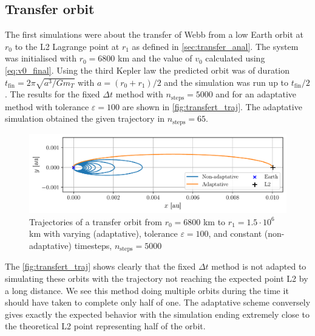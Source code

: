 \subsection{Transfer orbit}
The first simulations were about the transfer of Webb from a low Earth orbit at $r_0$ to the L2 Lagrange point at $r_1$ as defined in \autoref{sec:transfer_anal}. The system was initialised with \(r_0 = 6800\) km and the value of $v_0$ calculated using \autoref{eq:v0_final}. Using the third Kepler law the predicted orbit was of duration $t_\mathrm{fin} = 2\pi\sqrt{a^3/Gm_T}$ with $a = (r_0 + r_1)/2$ and the simulation was run up to $t_\mathrm{fin}/2$. The results for the fixed $\Delta t$ method with $n_\mathrm{steps} = 5000$ and for an adaptative method with tolerance $\varepsilon = 100$ are shown in \autoref{fig:transfert_traj}. The adaptative simulation obtained the given trajectory in $n_\mathrm{steps} = 65$.
\begin{figure}[H]
    \centering
    \includegraphics[width=\linewidth]{figures/transfert_comparaison.pdf}
    \caption{Trajectories of a transfer orbit from $r_0 = 6800$ \si{\kilo\meter} to $r_1 = 1.5 \cdot 10^6$ \si{\kilo\meter} with varying (adaptative), tolerance $\varepsilon = 100$, and constant (non-adaptative) timesteps, $n_\mathrm{steps} = 5000$}
    \label{fig:transfert_traj}
\end{figure}

The \autoref{fig:transfert_traj} shows clearly that the fixed $\Delta t$ method is not adapted to simulating these orbits with the trajectory not reaching the expected point L2 by a long distance. We see this method doing multiple orbits during the time it should have taken to complete only half of one. The adaptative scheme conversely gives exactly the expected behavior with the simulation ending extremely close to the theoretical L2 point representing half of the orbit.

